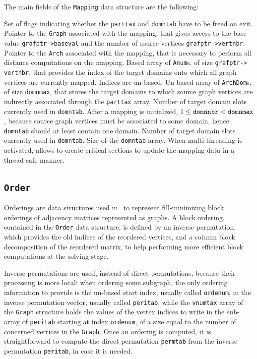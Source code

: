 The main fields of the \texttt{Mapping} data structure are the following:
\begin{itemize}
  Set of flags indicating whether the \texttt{parttax} and
  \texttt{domntab} have to be freed on exit.
  Pointer to the \texttt{Graph} associated with the mapping, that
  gives access to the base value \texttt{grafptr->\lbt baseval} and
  the number of source vertices \texttt{grafptr->\lbt vertnbr}.
  Pointer to the \texttt{Arch} associated with the mapping, that is
  necessary to perform all distance computations on the mapping.
  Based array of \texttt{Anum}s, of size \texttt{grafptr->\lbt
  vertnbr}, that provides the index of the target domains onto which
  all graph vertices are currently mapped. Indices are un-based.
  Un-based array of \texttt{ArchDom}s, of size \texttt{domnmax}, that
  stores the target domains to which source graph vertices are
  indirectly associated through the \texttt{parttax} array.
  Number of target domain slots currently used in
  \texttt{domntab}. After a mapping is initialized, $1 \leq
  \mbox{\texttt{domnnbr}} < \mbox{\texttt{domnmax}}$, because source
  graph vertices must be associated to some domain, hence
  \texttt{domntab} should at least contain one domain.
  Number of target domain slots currently used in
  \texttt{domntab}.
  Size of the \texttt{domntab} array.
  When multi-threading is activated, allows to create critical
  sections to update the mapping data in a thread-safe manner.
\end{itemize}

\subsection{\texttt{Order}}
\label{sec-data-order}

Orderings are data structures used in \scotch\ to represent
fill-minimizing block orderings of adjacency matrices represented as
graphs. A block ordering, contained in the \texttt{Order} data
structure, is defined by an inverse permutation, which provides the
old indices of the reordered vertices, and a column block
decomposition of the reordered matrix, to help performing more
efficient block computations at the solving stage.

Inverse permutations are used, instead of direct permutations, because
their processing is more local: when ordering some subgraph, the only
ordering information to provide is the un-based start index, usually
called \texttt{ordenum}, in the inverse permutation vector, usually
called \texttt{peritab}, while the \texttt{vnumtax} array of the
\texttt{Graph} structure holds the values of the vertex indices to
write in the sub-array of \texttt{peritab} starting at index
\texttt{ordenum}, of a size equal to the number of concerned vertices
in the \texttt{Graph}. Once an ordering is computed, it is
straightforward to compute the direct permutation \texttt{permtab}
from the inverse permutation \texttt{peritab}, in case it is needed.

